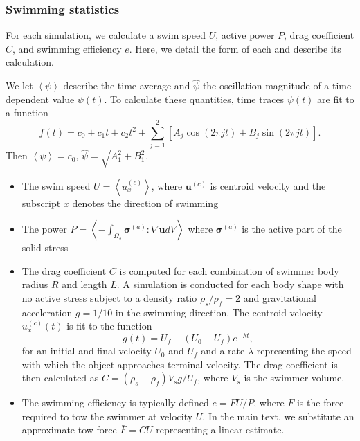 \documentclass[times, 10pt]{article}
\renewcommand{\vec}[1]{\mathbf{#1}}
\newcommand{\vu}{\vec{u}}
\newcommand{\vsigma}{\boldsymbol\sigma}
\begin{document}
        \subsubsection*{Swimming statistics} For each simulation, we calculate a swim speed $U$, active power $P$, drag coefficient $C$, and swimming efficiency $e$. Here, we detail the form of each and describe its calculation.
        
        We let $\left<\psi\right>$ describe the time-average and $\hat{\psi}$ the oscillation magnitude of a time-dependent value $\psi(t)$. To calculate these quantities, time traces $\psi(t)$ are fit to a function
        \begin{equation}
            f(t) = c_0 + c_1 t + c_2 t^2 + \sum_{j=1}^2 \left[A_j \cos(2\pi j t) + B_j \sin(2 \pi j t)\right].
        \end{equation}
        Then $\left<\psi\right> = c_0$, $\hat{\psi} = \sqrt{A_1^2+B_1^2}.$
        
        \begin{itemize}
            \item The swim speed $U = \left<u^{(c)}_x\right>$, where $\vu^{(c)}$ is centroid velocity and the subscript $x$ denotes the direction of swimming
            \item The power $P = \left<-\int_{\Omega_s} \vsigma^{(a)}:\nabla \vu dV\right>$
            where $\vsigma^{(a)}$ is the active part of the solid stress
            \item The drag coefficient $C$ is computed for each combination of swimmer body radius $R$ and length $L$.
            A simulation is conducted for each body shape with no active stress subject to a density ratio $\rho_s / \rho_f = 2$ and gravitational acceleration $g = 1/10$ in the swimming direction.
            The centroid velocity $u_x^{(c)}(t)$ is fit to the function
            \begin{equation}
                g(t) = U_f + (U_0-U_f) e^{-\lambda t},
            \end{equation}
            for an initial and final velocity $U_0$ and $U_f$ and a rate $\lambda$ representing the speed with which the object approaches terminal velocity. The drag coefficient is then calculated as $C = (\rho_s - \rho_f) V_s g / U_f$, where $V_s$ is the swimmer volume.
            \item The swimming efficiency is typically defined $e = F U/P$, where $F$ is the force required to tow the swimmer at velocity $U$.
            In the main text, we substitute an approximate tow force $\bar F = CU$ representing a linear estimate.
        \end{itemize}
    
\end{document}
